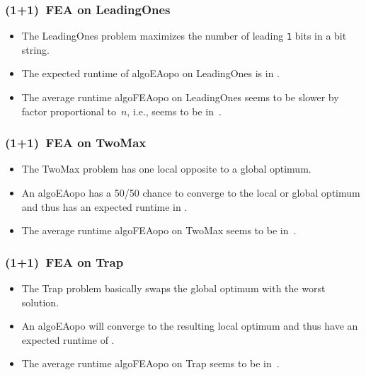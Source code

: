 \documentclass[aspectratio=169,mathserif,notheorems]{beamer}%
\begin{document}
%
\begin{frame}%
\frametitle{(1+1)~FEA on LeadingOnes}%
\parbox{0.37\paperwidth}{%
\begin{itemize}%
\item The LeadingOnes problem maximizes the number of leading \texttt{1} bits in a bit string\cite{W1989TGAASPWRBAORTIB,R1997CPOEA}.%
\item<2-> The expected runtime of \gls{algoEAopo} on LeadingOnes is in .\cite{DJW2002OTAOTOPOEA}%
\item<3-> The average runtime \gls{algoFEAopo} on LeadingOnes seems to be slower by factor proportional to~$n$, i.e., seems to be in~.%
\end{itemize}%
}%
%
%
%
\end{frame}%
%
\begin{frame}%
\frametitle{(1+1)~FEA on TwoMax}%
\parbox{0.37\paperwidth}{%
\begin{itemize}%
\item The TwoMax problem has one local opposite to a global optimum\cite{FQW2018ELDBOAWHTMO,VHGN2002FTTIMEAHSP}.%
\item<2-> An \gls{algoEAopo} has a 50/50 chance to converge to the local or global optimum and thus has an expected runtime in .\cite{FQW2018ELDBOAWHTMO,FOSW2009AODPMFGE}%
\item<3-> The average runtime \gls{algoFEAopo} on TwoMax seems to be in~.%
\end{itemize}%
}%
%
%
%
%
\end{frame}%
%
\begin{frame}%
\frametitle{(1+1)~FEA on Trap}%
\parbox{0.37\paperwidth}{%
\begin{itemize}%
\item The Trap problem basically swaps the global optimum with the worst solution\cite{DJW2002OTAOTOPOEA,NB2003AAOTBOSEAOTF}.%
\item<2-> An \gls{algoEAopo} will converge to the resulting local optimum and thus have an expected runtime of .\cite{DJW2002OTAOTOPOEA}%
\item<3-> The average runtime \gls{algoFEAopo} on Trap seems to be in~.%
\end{itemize}%
}\\%
%
%
%
%
%
\end{frame}%
\end{document}
